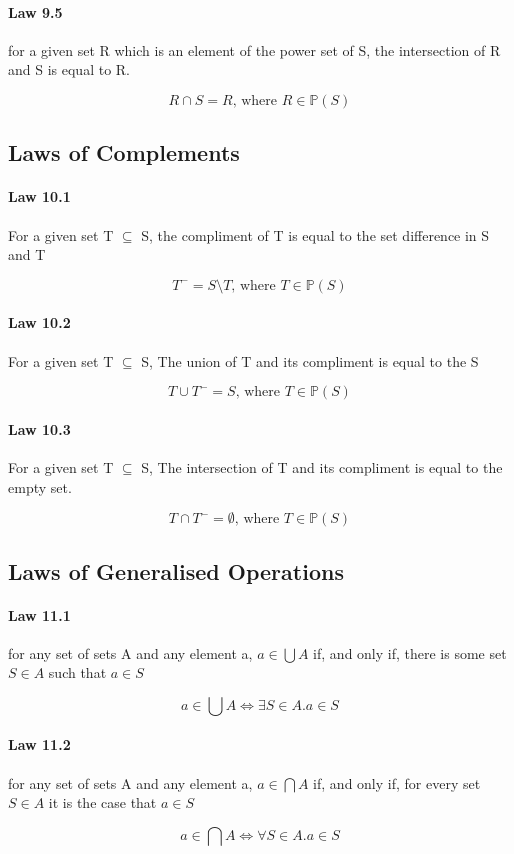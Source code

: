 \documentclass[twocolumn]{article}
\begin{document}
\paragraph{Law 9.5} for a given set R which is an element of the power set of S, the intersection of R and S is equal to R.

$$ R \cap S = R \text{, where } R \in \mathbb{P} ( S ) $$

\subsection{Laws of Complements}

\paragraph{Law 10.1} For a given set T $\subseteq$ S, the compliment of T is equal to the set difference in S and T

$$ T^{-} = S \setminus T \text{, where } T \in \mathbb{P} ( S ) $$

\paragraph{Law 10.2} For a given set T $\subseteq$ S, The union of T and its compliment is equal to the S

$$ T \cup T^{-} = S \text{, where } T \in \mathbb{P} ( S ) $$

\paragraph{Law 10.3} For a given set T $\subseteq$ S, The  intersection of T and its compliment is equal to the empty set.

$$ T \cap T^{-}  = \emptyset \text{,	where } T \in \mathbb{P} ( S ) $$

\subsection{Laws of Generalised Operations}

\paragraph{Law 11.1 } for any set of sets A and any element a, $a  \in   \bigcup  A $ if, and only if, there is some set $S  \in  A $ such that $ a  \in  S$

$$a  \in   \bigcup A \iff \exists S  \in  A . a  \in  S$$

\paragraph{Law 11.2} for any set of sets A and any element a, $a  \in  \bigcap A$ if, and only if, for every set $ S  \in  A $ it is the case that $ a  \in  S$

$$a  \in   \bigcap  A \iff \forall S  \in  A  . a  \in  S $$
\end{document}
